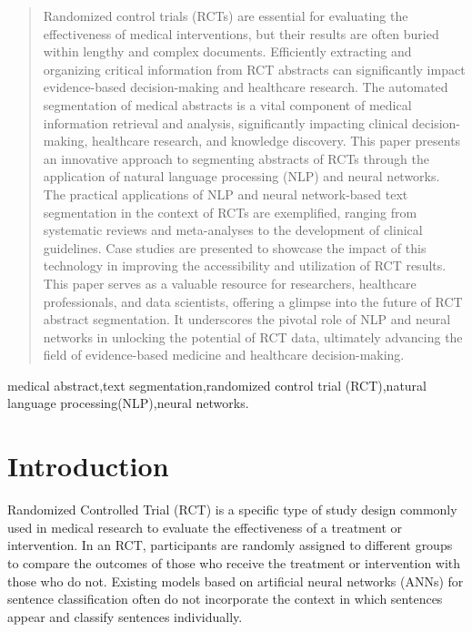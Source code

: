 \documentclass[conference]{IEEEtran}
\begin{document}
\begin{abstract}
Randomized control trials (RCTs) are essential for evaluating the effectiveness of medical interventions, but their results are often buried within lengthy and complex documents. Efficiently extracting and organizing critical information from RCT abstracts can significantly impact evidence-based decision-making and healthcare research.
The automated segmentation of medical abstracts is a vital component of medical information retrieval and analysis, significantly impacting clinical decision-making, healthcare research, and knowledge discovery. 
 This paper presents an innovative approach to segmenting abstracts of RCTs through the application of natural language processing (NLP) and neural networks.
 The practical applications of NLP and neural network-based text segmentation in the context of RCTs are exemplified, ranging from systematic reviews and meta-analyses to the development of clinical guidelines. Case studies are presented to showcase the impact of this technology in improving the accessibility and utilization of RCT results.
This paper serves as a valuable resource for researchers, healthcare professionals, and data scientists, offering a glimpse into the future of RCT abstract segmentation. It underscores the pivotal role of NLP and neural networks in unlocking the potential of RCT data, ultimately advancing the field of evidence-based medicine and healthcare decision-making.



\end{abstract}

\begin{IEEEkeywords}
medical abstract,text segmentation,randomized control trial (RCT),natural language processing(NLP),neural networks.
\end{IEEEkeywords}

\section{Introduction}
Randomized Controlled Trial (RCT) is a specific type of study design commonly used in medical research to evaluate the effectiveness of a treatment or intervention. In an RCT, participants are randomly assigned to different groups to compare the outcomes of those who receive the treatment or intervention with those who do not.  Existing models based on artificial neural networks (ANNs) for sentence classification often do not incorporate the context in which sentences appear and classify sentences individually.
\end{document}
